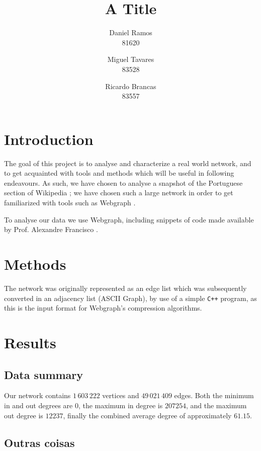 \documentclass[9pt,a4paper]{article}
\title{A Title}
\author{Daniel Ramos \\ 81620 \and Miguel Tavares \\ 83528 \and Ricardo Brancas  \\ 83557}
\begin{document}
\maketitle

\section{Introduction}
The goal of this project is to analyse and characterize a real world network, and to  get 
acquainted with tools and methods which will be useful in following endeavours.
As such, we have chosen to analyse a snapshot of the Portuguese section of Wikipedia \cite{dataset};
we have chosen such a large network in order to get familiarized with tools such as Webgraph \cite{webgraph}.

To analyse our data we use Webgraph, including snippets of code made available
by Prof. Alexandre Francisco \cite{aplf}.


\section{Methods}
The network was originally represented as an edge list which was subsequently converted in an adjacency list (ASCII Graph), by use of a simple \texttt{C++} program, as this is the input
format for Webgraph's compression algorithms. 





\section{Results}
\subsection{Data summary}
Our network contains $1\,603\,222$ vertices and $49\,021\,409$ edges. Both the minimum in and out degrees are $0$, the maximum in degree is $207254$, and the maximum out degree is $12237$, finally the combined average degree of approximately $61.15$.

\subsection{Outras coisas}
\end{document}
